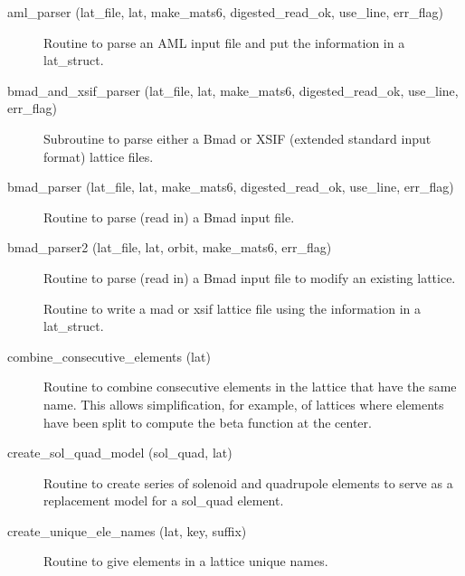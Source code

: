 \begin{description}

\label{r:aml.parser}
\item[aml_parser (lat_file, lat, make_mats6, digested_read_ok, use_line, err_flag)] \Newline 
Routine to parse an AML input file and put the information in a lat_struct.

\label{r:bmad.and.xsif.parser}
\item[bmad_and_xsif_parser (lat_file, lat, make_mats6, digested_read_ok, use_line, err_flag)] \Newline 
Subroutine to parse either a Bmad or XSIF (extended standard input format) lattice files.

\label{r:bmad.parser}
\item[bmad_parser (lat_file, lat, make_mats6, digested_read_ok, use_line, err_flag)] \Newline
Routine to parse (read in) a Bmad input file. 

\label{r:bmad.parser2}
\item[bmad_parser2 (lat_file, lat, orbit, make_mats6, err_flag)] \Newline
Routine to parse (read in) a Bmad input file to modify an existing lattice. 

\label{r:bmad.to.mad.or.xsif}
\item[\protect\parbox{6in}{bmad_to_mad_or_xsif (out_type, out_file_name, lat, use_matrix_model, \\
  \hspace*{1in} ix_start, ix_end, converted_lat, err)}] \Newline 
Routine to write a mad or xsif lattice file using the information in
a lat_struct. 

\label{r:combine.consecutive.elements}
\item[combine_consecutive_elements (lat)] \Newline 
Routine to combine consecutive elements in the lattice that have the same name.
This allows simplification, for example, of lattices where elements have been split 
to compute the beta function at the center.

\label{r:create.sol.quad.model}
\item[create_sol_quad_model (sol_quad, lat)] \Newline 
Routine to create series of solenoid and quadrupole elements to serve as a replacement
model for a sol_quad element.

\label{r:create.unique.ele.names}
\item[create_unique_ele_names (lat, key, suffix)] \Newline 
Routine to give elements in a lattice unique names.


\end{description}
